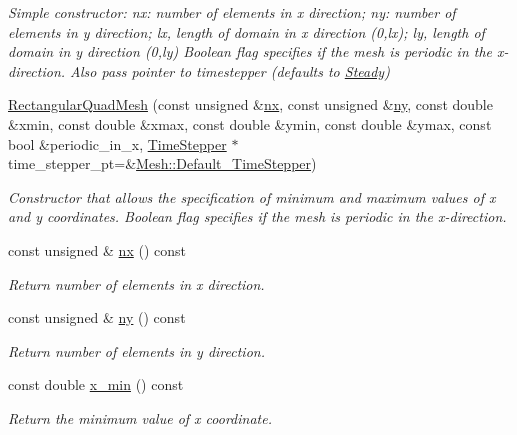 \begin{DoxyCompactItemize}
\begin{DoxyCompactList}\small\item\em Simple constructor\+: nx\+: number of elements in x direction; ny\+: number of elements in y direction; lx, length of domain in x direction (0,lx); ly, length of domain in y direction (0,ly) Boolean flag specifies if the mesh is periodic in the x-\/direction. Also pass pointer to timestepper (defaults to \hyperlink{classoomph_1_1Steady}{Steady}) \end{DoxyCompactList}\item 
\hyperlink{classoomph_1_1RectangularQuadMesh_ac36869a7d72ec7524b18272657cb6167}{Rectangular\+Quad\+Mesh} (const unsigned \&\hyperlink{classoomph_1_1RectangularQuadMesh_abfef93d6322886cdce14a437186e4821}{nx}, const unsigned \&\hyperlink{classoomph_1_1RectangularQuadMesh_a86d76a55eb7c4e8bca9b74d23c8b0412}{ny}, const double \&xmin, const double \&xmax, const double \&ymin, const double \&ymax, const bool \&periodic\+\_\+in\+\_\+x, \hyperlink{classoomph_1_1TimeStepper}{Time\+Stepper} $\ast$time\+\_\+stepper\+\_\+pt=\&\hyperlink{classoomph_1_1Mesh_a12243d0fee2b1fcee729ee5a4777ea10}{Mesh\+::\+Default\+\_\+\+Time\+Stepper})
\begin{DoxyCompactList}\small\item\em Constructor that allows the specification of minimum and maximum values of x and y coordinates. Boolean flag specifies if the mesh is periodic in the x-\/direction. \end{DoxyCompactList}\item 
const unsigned \& \hyperlink{classoomph_1_1RectangularQuadMesh_abfef93d6322886cdce14a437186e4821}{nx} () const
\begin{DoxyCompactList}\small\item\em Return number of elements in x direction. \end{DoxyCompactList}\item 
const unsigned \& \hyperlink{classoomph_1_1RectangularQuadMesh_a86d76a55eb7c4e8bca9b74d23c8b0412}{ny} () const
\begin{DoxyCompactList}\small\item\em Return number of elements in y direction. \end{DoxyCompactList}\item 
const double \hyperlink{classoomph_1_1RectangularQuadMesh_ab311c3bec7f9f721bae1f93e0798ab2c}{x\+\_\+min} () const
\begin{DoxyCompactList}\small\item\em Return the minimum value of x coordinate. \end{DoxyCompactList}\item 

\end{DoxyCompactItemize}
